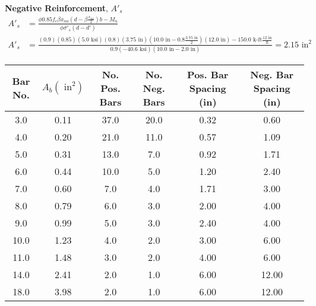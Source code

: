\documentclass{article}%
\begin{document}
 \textbf{Negative Reinforcement}, $A'_s$%
\begin{align*}A'_s &= \frac{\phi 0.85 f_c \beta x_{na} \left(d - \beta \frac{x_{na}}{2}\right) b - M_u}{\phi \sigma'_s (d - d')} \\A'_s &= \frac{(0.9)(0.85)(5.0 \text{ ksi})(0.8)(3.75 \text{ in})\left(10.0 \text{ in} - 0.8 \frac{3.75 \text{ in}}{2}\right)(12.0 \text{ in}) - 150.0 \text{ k-ft}\frac{12 \text{ in}}{\text{ft}}}{0.9 (-40.6 \text{ ksi}) (10.0 \text{ in} - 2.0 \text{ in})} = 2.15 \text{ in}^2\end{align*}%
\begin{center}
%
\begin{tabular}{cccccc}
\toprule
 Bar No. &  $A_b({\text{ in}}^2)$ &  No. Pos. Bars &  No. Neg. Bars &  Pos. Bar Spacing (in) &  Neg. Bar Spacing (in) \\
\midrule
     3.0 &                   0.11 &           37.0 &           20.0 &                   0.32 &                   0.60 \\
     4.0 &                   0.20 &           21.0 &           11.0 &                   0.57 &                   1.09 \\
     5.0 &                   0.31 &           13.0 &            7.0 &                   0.92 &                   1.71 \\
     6.0 &                   0.44 &           10.0 &            5.0 &                   1.20 &                   2.40 \\
     7.0 &                   0.60 &            7.0 &            4.0 &                   1.71 &                   3.00 \\
     8.0 &                   0.79 &            6.0 &            3.0 &                   2.00 &                   4.00 \\
     9.0 &                   0.99 &            5.0 &            3.0 &                   2.40 &                   4.00 \\
    10.0 &                   1.23 &            4.0 &            2.0 &                   3.00 &                   6.00 \\
    11.0 &                   1.48 &            3.0 &            2.0 &                   4.00 &                   6.00 \\
    14.0 &                   2.41 &            2.0 &            1.0 &                   6.00 &                  12.00 \\
    18.0 &                   3.98 &            2.0 &            1.0 &                   6.00 &                  12.00 \\
\bottomrule
\end{tabular}
%
\end{center}

%
\end{document}
